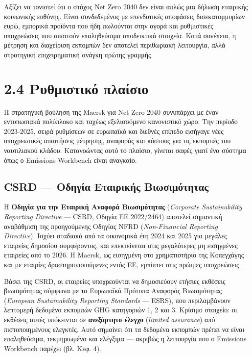 \documentclass[11pt,a4paper,greek,twoside]{template-xe}
\begin{document}
Αξίζει να τονιστεί ότι ο στόχος Net Zero 2040 δεν είναι απλώς μια δήλωση
εταιρικής κοινωνικής ευθύνης. Είναι συνδεδεμένος με επενδυτικές
αποφάσεις δισεκατομμυρίων ευρώ, εμπορικά προϊόντα που ήδη πωλούνται στην
αγορά και ρυθμιστικές υποχρεώσεις που απαιτούν επαληθεύσιμα αποδεικτικά
στοιχεία. Κατά συνέπεια, η μέτρηση και διαχείριση εκπομπών δεν αποτελεί
περιθωριακή λειτουργία, αλλά στρατηγική επιχειρηματική ανάγκη πρώτης
γραμμής.

\section{2.4 Ρυθμιστικό
πλαίσιο}\label{ux3c1ux3c5ux3b8ux3bcux3b9ux3c3ux3c4ux3b9ux3baux3cc-ux3c0ux3bbux3b1ux3afux3c3ux3b9ux3bf}

Η στρατηγική βούληση της Maersk για Net Zero 2040 συνυπάρχει με έναν
εντυπωσιακά πολύπλοκο και ταχέως εξελισσόμενο κανονιστικό χώρο. Την
περίοδο 2023-2025, σειρά ρυθμίσεων σε ευρωπαϊκό και διεθνές επίπεδο
εισήγαγε νέες υποχρεωτικές απαιτήσεις μέτρησης, αναφοράς και κόστους για
τις εκπομπές του ναυτιλιακού κλάδου. Κατανοώντας αυτό το πλαίσιο,
γίνεται σαφές γιατί ένα σύστημα όπως ο Emissions Workbench είναι
αναγκαίο.

\subsection{CSRD --- Οδηγία Εταιρικής
Βιωσιμότητας}\label{csrd-ux3bfux3b4ux3b7ux3b3ux3afux3b1-ux3b5ux3c4ux3b1ux3b9ux3c1ux3b9ux3baux3aeux3c2-ux3b2ux3b9ux3c9ux3c3ux3b9ux3bcux3ccux3c4ux3b7ux3c4ux3b1ux3c2}

Η \textbf{Οδηγία για την Εταιρική Αναφορά Βιωσιμότητας} (\emph{Corporate
Sustainability Reporting Directive} --- CSRD, Οδηγία ΕΕ 2022/2464)
αποτελεί σημαντική αναβάθμιση της προηγούμενης Οδηγίας NFRD
(\emph{Non-Financial Reporting Directive}). Ισχύει σταδιακά από τα
οικονομικά έτη 2024 και 2025 για μεγάλες εταιρείες δημοσίου συμφέροντος,
και επεκτείνεται στις μεγαλύτερες μη εισηγμένες εταιρείες από το 2026. Η
Maersk, ως εισηγμένη στο χρηματιστήριο της Κοπεγχάγης και με εταιρίες
δραστηριοποιούμενες εντός ΕΕ, εμπίπτει στις πρώιμες υποχρεώσεις.

Βάσει της CSRD, οι εταιρείες υποχρεούνται να δημοσιεύουν ετήσιες
εκθέσεις βιωσιμότητας σύμφωνα με τα Ευρωπαϊκά Πρότυπα Αναφοράς
Βιωσιμότητας (\emph{European Sustainability Reporting Standards} ---
ESRS), που περιλαμβάνουν λεπτομερή δεδομένα εκπομπών GHG κατηγοριών 1, 2
και 3. Κρίσιμο στοιχείο: οι εκθέσεις αυτές υπόκεινται σε
\textbf{ανεξάρτητο έλεγχο} (\emph{limited assurance}) από
πιστοποιημένους ελεγκτές. Αυτό σημαίνει ότι τα δεδομένα εκπομπών πρέπει
να είναι επαληθεύσιμα, τεκμηριωμένα και ελέγξιμα --- ακριβώς η
λειτουργία που ο Emissions Workbench παρέχει (βλ. Κεφ. 4).
\end{document}
